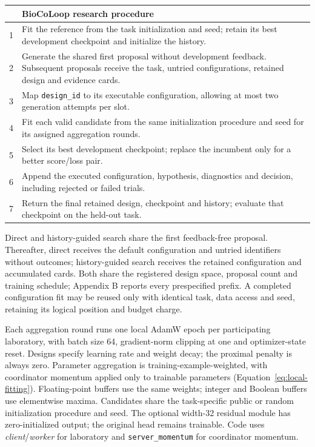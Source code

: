 \begin{center}\small
\begin{tabularx}{\linewidth}{@{}rX@{}}
\toprule
& \textbf{BioCoLoop research procedure} \\
\midrule
1 & Fit the reference from the task initialization and seed; retain its best development checkpoint and initialize the history. \\
2 & Generate the shared first proposal without development feedback. Subsequent proposals receive the task, untried configurations, retained design and evidence cards. \\
3 & Map \texttt{design\_id} to its executable configuration, allowing at most two generation attempts per slot. \\
4 & Fit each valid candidate from the same initialization procedure and seed for its assigned aggregation rounds. \\
5 & Select its best development checkpoint; replace the incumbent only for a better score/loss pair. \\
6 & Append the executed configuration, hypothesis, diagnostics and decision, including rejected or failed trials. \\
7 & Return the final retained design, checkpoint and history; evaluate that checkpoint on the held-out task. \\
\bottomrule
\end{tabularx}
\end{center}

Direct and history-guided search share the first feedback-free proposal. Thereafter, direct receives the default configuration and untried identifiers without outcomes; history-guided search receives the retained configuration and accumulated cards. Both share the registered design space, proposal count and training schedule; Appendix B reports every prespecified prefix. A completed configuration fit may be reused only with identical task, data access and seed, retaining its logical position and budget charge.

Each aggregation round runs one local AdamW epoch per participating laboratory, with batch size 64, gradient-norm clipping at one and optimizer-state reset. Designs specify learning rate and weight decay; the proximal penalty is always zero. Parameter aggregation is training-example-weighted, with coordinator momentum applied only to trainable parameters (Equation~\ref{eq:local-fitting}). Floating-point buffers use the same weights; integer and Boolean buffers use elementwise maxima. Candidates share the task-specific public or random initialization procedure and seed. The optional width-32 residual module has zero-initialized output; the original head remains trainable. Code uses \emph{client}/\emph{worker} for laboratory and \texttt{server\_momentum} for coordinator momentum.

